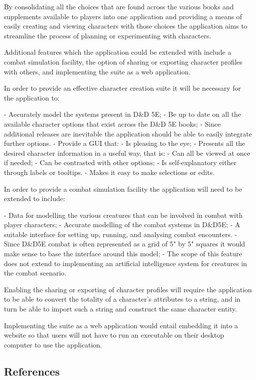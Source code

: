 \documentclass{article}
\begin{document}
By consolidating all the choices that are found across the various books and supplements available to players into one application and providing a means of easily creating and viewing characters with those choices the application aims to streamline the process of planning or experimenting with characters.

Additional features which the application could be extended with include a combat simulation facility, the option of sharing or exporting character profiles with others, and implementing the suite as a web application.

In order to provide an effective character creation suite it will be necessary for the application to:

- Accurately model the systems present in D\&D 5E;
- Be up to date on all the available character options that exist across the D\&D 5E books;
	- Since additional releases are inevitable the application should be able to easily integrate further options.
- Provide a GUI that:
	- Is pleasing to the eye;
	- Presents all the desired character information in a useful way, that is:
		- Can all be viewed at once if needed;
		- Can be contrasted with other options;
		- Is self-explanatory either through labels or tooltips.
	- Makes it easy to make selections or edits.

In order to provide a combat simulation facility the application will need to be extended to include:

- Data for modelling the various creatures that can be involved in combat with player characters;
- Accurate modelling of the combat systems in D\&D5E;
- A suitable interface for setting up, running, and analysing combat encounters.
- Since D\&D5E combat is often represented as a grid of 5" by 5" squares it would make sense to base the interface around this model;
- The scope of this feature does not extend to implementing an artificial intelligence system for creatures in the combat scenario.

Enabling the sharing or exporting of character profiles will require the application to be able to convert the totality of a character's attributes to a string, and in turn be able to import such a string and construct the same character entity.

Implementing the suite as a web application would entail embedding it into a website so that users will not have to run an executable on their desktop computer to use the application.



\subsection{References}
\end{document}
